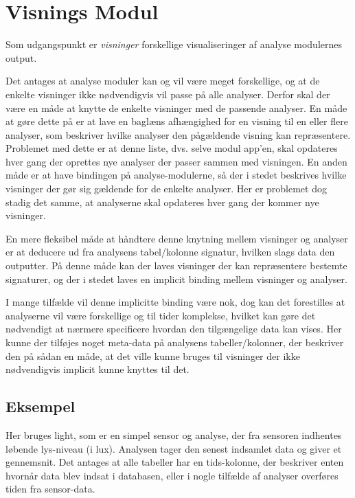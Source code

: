 \section{Visnings Modul}

Som udgangspunkt er \textit{visninger} forskellige visualiseringer af analyse modulernes output.

Det antages at analyse moduler kan og vil være meget forskellige, og at de enkelte visninger ikke nødvendigvis vil passe på alle analyser.
Derfor skal der være en måde at knytte de enkelte visninger med de passende analyser.
En måde at gøre dette på er at lave en baglæns afhængighed for en visning til en eller flere analyser, som beskriver hvilke analyser den pågældende visning kan repræsentere.
Problemet med dette er at denne liste, dvs. selve modul app'en, skal opdateres hver gang der oprettes nye analyser der passer sammen med visningen.
En anden måde er at have bindingen på analyse-modulerne, så der i stedet beskrives hvilke visninger der gør sig gældende for de enkelte analyser.
Her er problemet dog stadig det samme, at analyserne skal opdateres hver gang der kommer nye visninger.

En mere fleksibel måde at håndtere denne knytning mellem visninger og analyser er at deducere ud fra analysens tabel/kolonne signatur, hvilken slags data den outputter.
På denne måde kan der laves visninger der kan repræsentere bestemte signaturer, og der i stedet laves en implicit binding mellem visninger og analyser.

I mange tilfælde vil denne implicitte binding være nok, dog kan det forestilles at analyserne vil være forskellige og til tider komplekse, hvilket kan gøre det nødvendigt at nærmere specificere hvordan den tilgængelige data kan vises.
Her kunne der tilføjes noget meta-data på analysens tabeller/kolonner, der beskriver den på sådan en måde, at det ville kunne bruges til visninger der ikke nødvendigvis implicit kunne knyttes til det.

\subsection{Eksempel}
Her bruges light, som er en simpel sensor og analyse, der fra sensoren indhentes løbende lys-niveau (i lux).
Analysen tager den senest indsamlet data og giver et gennemsnit.
Det antages at alle tabeller har en tids-kolonne, der beskriver enten hvornår data blev indsat i databasen, eller i nogle tilfælde af analyser overføres tiden fra sensor-data.

